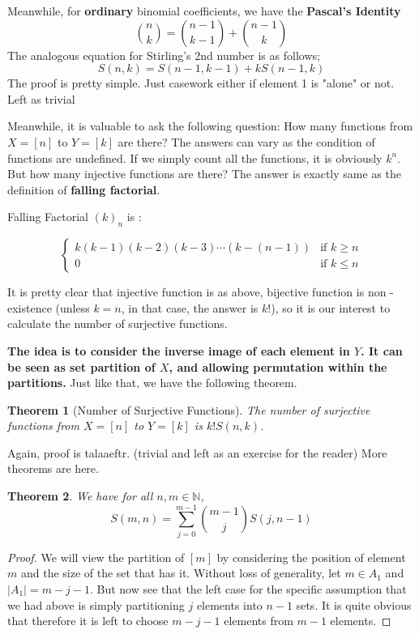 \documentclass[12pt]{article}
\newtheorem{theorem}{Theorem}[section]
\newcommand{\mb}{\mathbb}
\begin{document}
Meanwhile, for \textbf{ordinary} binomial coefficients, we have the \textbf{Pascal's Identity}
\[
\binom{n}{k} = \binom{n-1}{k-1} + \binom{n-1}{k}
\]
The analogous equation for Stirling's 2nd number is as follows;
\[
S(n,k) = S(n-1,k-1) + kS(n-1,k)
\]
The proof is pretty simple. Just casework either if element 1 is "alone" or not. Left as trivial

Meanwhile, it is valuable to ask the following question: How many functions from $X = [n]$ to $Y = [k] $ are there? The answers can vary as the condition of functions are undefined. If we simply count all the functions, it is obviously $k^n$. But how many injective functions are there? The answer is exactly same as the definition of \textbf{falling factorial}.

\begin{description}
  \item[Falling Factorial $(k)_n$ is :]
\end{description}
\[
\begin{cases}
  k(k-1)(k-2)(k-3) \cdots (k-(n-1)) &\text{if } k \geq n \\
  0 &\text{if } k \leq n
\end{cases}
\]

It is pretty clear that injective function is as above, bijective function is non - existence (unless $k = n$, in that case, the answer is $k!$), so it is our interest to calculate the number of surjective functions.

\textbf{The idea is to consider the inverse image of each element in $Y$. It can be seen as set partition of $X$, and allowing permutation within the partitions.} Just like that, we have the following theorem.

\begin{theorem}[Number of Surjective Functions]
  The number of surjective functions from $X = [n]$ to $Y = [k]$ is $k!S(n,k)$.
\end{theorem}
 Again, proof is talaaeftr. (trivial and left as an exercise for the reader)
 More theorems are here.
\begin{theorem} We have for all $n,m\in \mb{N}$,
\[
S(m,n) = \sum_{j=0}^{m-1} \binom{m-1}{j} S(j,n-1)
\]
\end{theorem}
\begin{proof}
  We will view the partition of $[m]$ by considering the position of element $m$ and the size of the set that has it. Without loss of generality, let $m \in A_1$ and $|A_1| = m -j-1$. But now see that the left case for the specific assumption that we had above is simply partitioning $j$ elements into $n-1$ sets. It is quite obvious that therefore it is left to choose $m-j-1$ elements from $m-1$ elements.

\end{proof}
\end{document}
